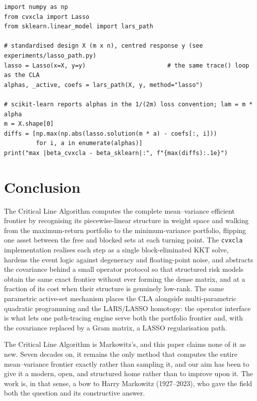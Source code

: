 \documentclass[11pt]{article}
\begin{document}
\begin{lstlisting}[style=pyin,caption={The CLA path tracer drives a LASSO through
\texttt{cvxcla.Lasso}, matched against scikit-learn's \texttt{lars\_path}.},label={lst:lasso}]
import numpy as np
from cvxcla import Lasso
from sklearn.linear_model import lars_path

# standardised design X (m x n), centred response y (see experiments/lasso_path.py)
lasso = Lasso(x=X, y=y)                       # the same trace() loop as the CLA
alphas, _active, coefs = lars_path(X, y, method="lasso")

# scikit-learn reports alphas in the 1/(2m) loss convention; lam = m * alpha
m = X.shape[0]
diffs = [np.max(np.abs(lasso.solution(m * a) - coefs[:, i]))
         for i, a in enumerate(alphas)]
print("max |beta_cvxcla - beta_sklearn|:", f"{max(diffs):.1e}")
\end{lstlisting}


\section{Conclusion}

The Critical Line Algorithm computes the complete mean--variance efficient frontier by
recognising its piecewise-linear structure in weight space and walking from the
maximum-return portfolio to the minimum-variance portfolio, flipping one asset between
the free and blocked sets at each turning point. The \texttt{cvxcla} implementation
realises each step as a single block-eliminated KKT solve, hardens the event logic
against degeneracy and floating-point noise, and abstracts the covariance behind a
small operator protocol so that structured risk models obtain the same exact frontier
without ever forming the dense matrix, and at a fraction of its cost when their
structure is genuinely low-rank. The same parametric active-set mechanism places the
CLA alongside multi-parametric quadratic programming and the LARS/LASSO homotopy: the
operator interface is what lets one path-tracing engine serve both the portfolio
frontier and, with the covariance replaced by a Gram matrix, a LASSO regularisation
path.

The Critical Line Algorithm is Markowitz's, and this paper claims none of it as new.
Seven decades on, it remains the only method that computes the entire mean--variance
frontier exactly rather than sampling it, and our aim has been to give it a modern,
open, and structured home rather than to improve upon it. The work is, in that sense, a
bow to Harry Markowitz (1927--2023), who gave the field both the question and its
constructive answer.
\end{document}
